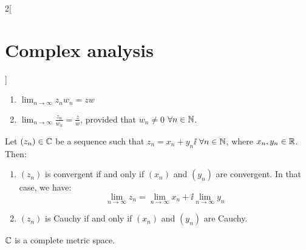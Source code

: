 \documentclass[../../../main_math.tex]{subfiles}
\begin{document}
\begin{multicols}{2}[\section{Complex analysis}]
\begin{proposition}
\begin{enumerate}
      \item $\displaystyle\lim_{n\to\infty}z_nw_n=zw$
      \item $\displaystyle\lim_{n\to\infty}\frac{z_n}{w_n}=\frac{z}{w}$, provided that $w_n\ne 0$ $\forall n\in\mathbb{N}$.
    \end{enumerate}
  \end{proposition}
  \begin{definition}
    Let $(z_n)\in\mathbb{C}$ be a sequence such that $z_n=x_n+y_n\ii$ $\forall n\in\mathbb{N}$, where $x_n,y_n\in\mathbb{R}$. Then:
    \begin{enumerate}
      \item $(z_n)$ is convergent if and only if $(x_n)$ and $(y_n)$ are convergent. In that case, we have: $$\lim_{n\to\infty}z_n=\lim_{n\to\infty}x_n+\ii\lim_{n\to\infty}y_n$$
      \item $(z_n)$ is Cauchy if and only if $(x_n)$ and $(y_n)$ are Cauchy.
    \end{enumerate}
  \end{definition}
  \begin{theorem}
    $\mathbb{C}$ is a complete metric space.
  \end{theorem}

\end{multicols}
\end{document}
